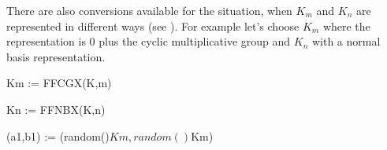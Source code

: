 {{{{{{{{{{{{{{{{{{\begin{xtc}
\begin{TeXOutput}
\begin{fricasmath}{10}
\end{fricasmath}
\end{TeXOutput}
\end{xtc}
%
There are also conversions available for the
situation, when $K_m$ and $K_n$
are represented in different ways (see
).
For example let's choose $K_m$ where the
representation is 0 plus the cyclic multiplicative group and
$K_n$ with a normal basis representation.
\begin{xtc}
\begin{xtccomment}
\end{xtccomment}
\begin{spadsrc}
Km := FFCGX(K,m) 
\end{spadsrc}
\begin{TeXOutput}
\begin{fricasmath}{11}
%
\end{fricasmath}
\end{TeXOutput}
\end{xtc}
\begin{xtc}
\begin{xtccomment}
\end{xtccomment}
\begin{spadsrc}
Kn := FFNBX(K,n) 
\end{spadsrc}
\begin{TeXOutput}
\begin{fricasmath}{12}
%
\end{fricasmath}
\end{TeXOutput}
\end{xtc}
\begin{xtc}
\begin{xtccomment}
\end{xtccomment}
\begin{spadsrc}
(a1,b1) := (random()$Km,random()$Km) 
\end{spadsrc}
\begin{TeXOutput}
\begin{fricasmath}{13}
%
\end{fricasmath}
\end{TeXOutput}
\end{xtc}
\begin{xtc}

\end{xtc}}}}}}}}}}}}}}}}}}}
